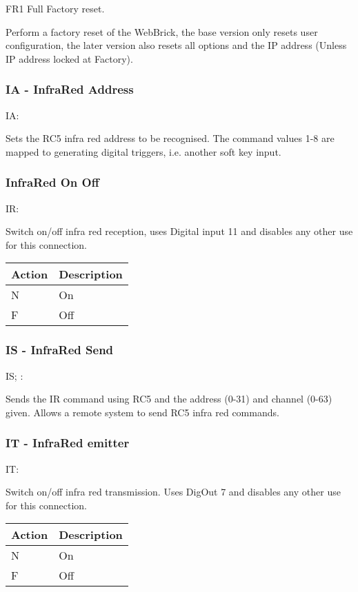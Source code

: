 FR1  Full Factory reset.

Perform a factory reset of the WebBrick, the base version only resets user configuration, the later version also resets 
all options and the IP address (Unless IP address locked at Factory).

\subsubsection{IA - InfraRed Address}
IA:

Sets the RC5 infra red address to be recognised. The command values 1-8 are mapped to generating digital triggers, 
i.e. another soft key input.

\subsubsection{InfraRed On Off}
IR:

Switch on/off infra red reception, uses Digital input 11 and disables any other use for this connection.

\begin{tabular}{l|p{12cm}}
Action&Description\\
\hline
N&On\\
F&Off\\
\end{tabular}

\subsubsection{IS - InfraRed Send}
IS; :

Sends the IR command using RC5 and the address (0-31) and channel (0-63) given. Allows a remote system
to send RC5 infra red commands.


\subsubsection{IT - InfraRed emitter}
IT:

Switch on/off infra red transmission. Uses DigOut 7 and disables any other use for this connection.

\begin{tabular}{l|p{12cm}}
Action&Description\\
\hline
N&On\\
F&Off\\
\end{tabular}

